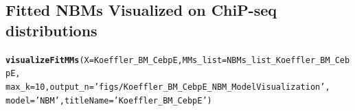\documentclass{article}\usepackage[]{graphicx}\usepackage[]{color}
\makeatletter
\newcommand{\hlnum}[1]{\textcolor[rgb]{0.686,0.059,0.569}{#1}}%
\newcommand{\hlstr}[1]{\textcolor[rgb]{0.192,0.494,0.8}{#1}}%
\newcommand{\hlstd}[1]{\textcolor[rgb]{0.345,0.345,0.345}{#1}}%
\newcommand{\hlkwc}[1]{\textcolor[rgb]{0.333,0.667,0.333}{#1}}%
\newcommand{\hlkwd}[1]{\textcolor[rgb]{0.737,0.353,0.396}{\textbf{#1}}}%
\newenvironment{kframe}{%
 \def\at@end@of@kframe{}%
 \ifinner\ifhmode%
  \def\at@end@of@kframe{\end{minipage}}%
  \begin{minipage}{\columnwidth}%
 \fi\fi%
 \def\FrameCommand##1{\hskip\@totalleftmargin \hskip-\fboxsep
 \colorbox{shadecolor}{##1}\hskip-\fboxsep
     \hskip-\linewidth \hskip-\@totalleftmargin \hskip\columnwidth}%
 \MakeFramed {\advance\hsize-\width
   \@totalleftmargin\z@ \linewidth\hsize
   \@setminipage}}%
 {\par\unskip\endMakeFramed%
 \at@end@of@kframe}
\newenvironment{knitrout}{}{} %
\makeatother
\begin{document}
\subsection{Fitted NBMs Visualized on ChiP-seq distributions}

\begin{knitrout}
\color{fgcolor}\begin{kframe}
\begin{alltt}
\hlkwd{visualizeFitMMs}\hlstd{(}\hlkwc{X}\hlstd{=Koeffler_BM_CebpE,} \hlkwc{MMs_list}\hlstd{=NBMs_list_Koeffler_BM_CebpE,}
                \hlkwc{max_k}\hlstd{=}\hlnum{10}\hlstd{,} \hlkwc{output_n}\hlstd{=}\hlstr{'figs/Koeffler_BM_CebpE_NBM_ModelVisualization'}\hlstd{,}
                \hlkwc{model} \hlstd{=} \hlstr{'NBM'}\hlstd{,} \hlkwc{titleName}\hlstd{=}\hlstr{'Koeffler_BM_CebpE'}\hlstd{)}
\end{alltt}
\end{kframe}
\end{knitrout}
\end{document}
